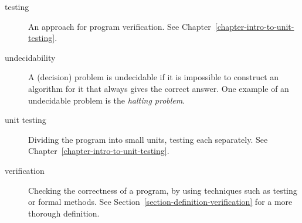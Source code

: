 \begin{description}
  \item[testing] An approach for program verification. See
    Chapter~\ref{chapter-intro-to-unit-testing}.

  \item[undecidability] A (decision) problem is undecidable if it is impossible
    to construct an algorithm for it that always gives the correct answer. One
    example of an undecidable problem is the \textit{halting problem}.

  \item[unit testing] Dividing the program into small units, testing each
    separately. See Chapter~\ref{chapter-intro-to-unit-testing}.

  \item[verification] Checking the correctness of a program, by using
    techniques such as testing or formal methods. See
    Section~\ref{section-definition-verification} for a more thorough
    definition.
\end{description}

